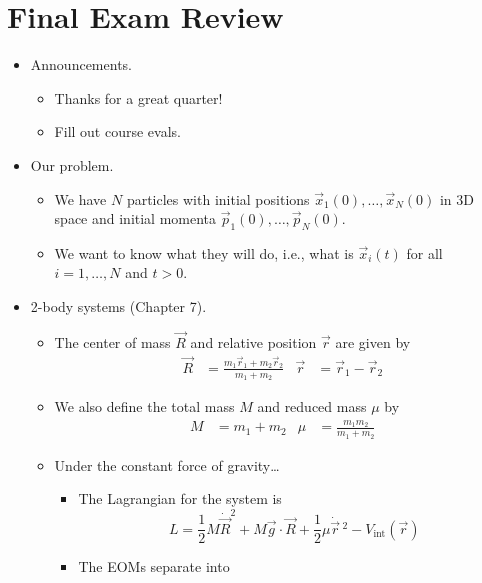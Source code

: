 \documentclass[../notes.tex]{subfiles}
\begin{document}
\section{Final Exam Review}
\begin{itemize}
    \item {}Announcements.
    \begin{itemize}
        \item Thanks for a great quarter!
        \item Fill out course evals.
    \end{itemize}
    \item Our problem.
    \begin{itemize}
        \item We have $N$ particles with initial positions $\vec{x}_1(0),\dots,\vec{x}_N(0)$ in 3D space and initial momenta $\vec{p}_1(0),\dots,\vec{p}_N(0)$.
        \item We want to know what they will do, i.e., what is $\vec{x}_i(t)$ for all $i=1,\dots,N$ and $t>0$.
    \end{itemize}
    \item 2-body systems (Chapter 7).
    \begin{itemize}
        \item The center of mass $\vec{R}$ and relative position $\vec{r}$ are given by
        \begin{align*}
            \vec{R} &= \frac{m_1\vec{r}_1+m_2\vec{r}_2}{m_1+m_2}&
            \vec{r} &= \vec{r}_1-\vec{r}_2
        \end{align*}
        \item We also define the total mass $M$ and reduced mass $\mu$ by
        \begin{align*}
            M &= m_1+m_2&
            \mu &= \frac{m_1m_2}{m_1+m_2}
        \end{align*}
        \item Under the constant force of gravity\dots
        \begin{itemize}
            \item The Lagrangian for the system is
            \begin{equation*}
                L = \frac{1}{2}M\dot{\vec{R}}^2+M\vec{g}\cdot\vec{R}+\frac{1}{2}\mu\dot{\vec{r}}{\,}^2-V_\text{int}(\vec{r})
            \end{equation*}
            \item The EOMs separate into
            \begin{align*}

\end{align*}
\end{itemize}
\end{itemize}
\end{itemize}
\end{document}
